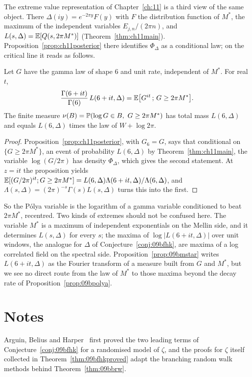 The extreme value representation of Chapter~\ref{ch:11} is a third view of the same object. There $\Delta(iy)=e^{-2\pi y}F(y)$ with $F$ the distribution function of $M^*$, the maximum of the independent variables $E_{j,n}/(2\pi n)$, and $L(s,\Delta)=\mathbb{E}[Q(s,2\pi M^*)]$ (Theorem~\ref{thm:ch11main}). Proposition~\ref{prop:ch11posterior} there identifies $\Phi_\Delta$ as a conditional law; on the critical line it reads as follows.

\begin{proposition}\label{prop:09bmstar}
Let $G$ have the gamma law of shape $6$ and unit rate, independent of $M^*$. For real $t$,
\[
\frac{\Gamma(6+it)}{\Gamma(6)}\,L(6+it,\Delta)=\mathbb{E}\bigl[G^{it}\,;\,G\ge2\pi M^*\bigr].
\]
The finite measure $\nu(B)=\mathbb{P}(\log G\in B,\ G\ge2\pi M^*)$ has total mass $L(6,\Delta)$ and equals $L(6,\Delta)$ times the law of $W+\log2\pi$.
\end{proposition}

\begin{proof}
Proposition~\ref{prop:ch11posterior}, with $G_6=G$, says that conditional on $\{G\ge2\pi M^*\}$, an event of probability $L(6,\Delta)$ by Theorem~\ref{thm:ch11main}, the variable $\log(G/2\pi)$ has density $\Phi_\Delta$, which gives the second statement. At $z=it$ the proposition yields $\mathbb{E}[(G/2\pi)^{it};G\ge2\pi M^*]=L(6,\Delta)\Lambda(6+it,\Delta)/\Lambda(6,\Delta)$, and $\Lambda(s,\Delta)=(2\pi)^{-s}\Gamma(s)L(s,\Delta)$ turns this into the first.
\end{proof}

So the P\'olya variable is the logarithm of a gamma variable conditioned to beat $2\pi M^*$, recentred. Two kinds of extremes should not be confused here. The variable $M^*$ is a maximum of independent exponentials on the Mellin side, and it determines $L(s,\Delta)$ for every $s$; the maxima of $\log|L(6+it,\Delta)|$ over unit windows, the analogue for $\Delta$ of Conjecture~\ref{conj:09bfhk}, are maxima of a log correlated field on the spectral side. Proposition~\ref{prop:09bmstar} writes $L(6+it,\Delta)$ as the Fourier transform of a measure built from $G$ and $M^*$, but we see no direct route from the law of $M^*$ to those maxima beyond the decay rate of Proposition~\ref{prop:09bpolya}.

\section{Notes}

Arguin, Belius and Harper~\cite{abh2017} first proved the two leading terms of Conjecture~\ref{conj:09bfhk} for a randomised model of $\zeta$, and the proofs for $\zeta$ itself collected in Theorem~\ref{thm:09bfhkproved} adapt the branching random walk methods behind Theorem~\ref{thm:09bbrw}.

